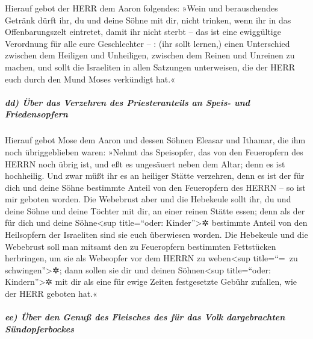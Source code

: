 Hierauf gebot der HERR dem Aaron folgendes:
»Wein und berauschendes Getränk dürft ihr, du und deine
Söhne mit dir, nicht trinken, wenn ihr in das Offenbarungszelt
eintretet, damit ihr nicht sterbt -- das ist eine ewiggültige Verordnung
für alle eure Geschlechter -- : (ihr sollt lernen,) einen
Unterschied zwischen dem Heiligen und Unheiligen, zwischen dem Reinen
und Unreinen zu machen, und sollt die Israeliten in allen
Satzungen unterweisen, die der HERR euch durch den Mund Moses verkündigt
hat.«

\hypertarget{dd-uxfcber-das-verzehren-des-priesteranteils-an-speis--und-friedensopfern}{%
\subparagraph{dd) Über das Verzehren des Priesteranteils an Speis- und
Friedensopfern}\label{dd-uxfcber-das-verzehren-des-priesteranteils-an-speis--und-friedensopfern}}

Hierauf gebot Mose dem Aaron und dessen Söhnen Eleasar
und Ithamar, die ihm noch übriggeblieben waren: »Nehmt das Speisopfer,
das von den Feueropfern des HERRN noch übrig ist, und eßt es ungesäuert
neben dem Altar; denn es ist hochheilig. Und zwar müßt
ihr es an heiliger Stätte verzehren, denn es ist der für dich und deine
Söhne bestimmte Anteil von den Feueropfern des HERRN -- so ist mir
geboten worden. Die Webebrust aber und die Hebekeule
sollt ihr, du und deine Söhne und deine Töchter mit dir, an einer reinen
Stätte essen; denn als der für dich und deine Söhne\textless sup
title=``oder: Kinder''\textgreater✲ bestimmte Anteil von den Heilsopfern
der Israeliten sind sie euch überwiesen worden. Die
Hebekeule und die Webebrust soll man mitsamt den zu Feueropfern
bestimmten Fettstücken herbringen, um sie als Webeopfer vor dem HERRN zu
weben\textless sup title=``=~zu schwingen''\textgreater✲; dann sollen
sie dir und deinen Söhnen\textless sup title=``oder:
Kindern''\textgreater✲ mit dir als eine für ewige Zeiten festgesetzte
Gebühr zufallen, wie der HERR geboten hat.«

\hypertarget{ee-uxfcber-den-genuuxdf-des-fleisches-des-fuxfcr-das-volk-dargebrachten-suxfcndopferbockes}{%
\subparagraph{ee) Über den Genuß des Fleisches des für das Volk
dargebrachten
Sündopferbockes}\label{ee-uxfcber-den-genuuxdf-des-fleisches-des-fuxfcr-das-volk-dargebrachten-suxfcndopferbockes}}

